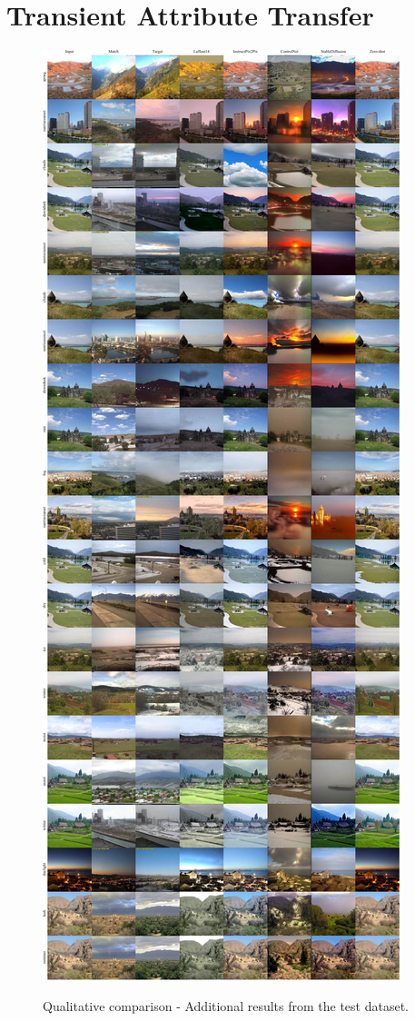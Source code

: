 \chapter{Transient Attribute Transfer}
\label{TAT:add_res}


\begin{figure}[ht]
  \centering
  {\includegraphics[width=0.95\linewidth]{Chapters/appendix-figs/TAT-compressed.pdf}}

   \caption{Qualitative comparison - Additional results from the test dataset.}
   \label{fig:appendix-tat1}
\end{figure}

